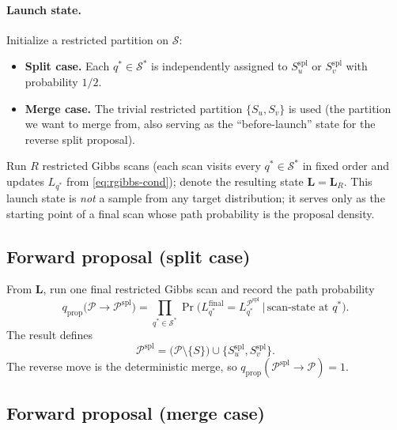 \documentclass[11pt]{article}
\begin{document}
\paragraph{Launch state.}
Initialize a restricted partition on $\mathcal{S}$:
\begin{itemize}
\item \textbf{Split case.} Each $q^*\in\mathcal{S}^*$ is independently
  assigned to $S^{\mathrm{spl}}_u$ or $S^{\mathrm{spl}}_v$ with probability
  $1/2$.
\item \textbf{Merge case.} The trivial restricted partition
  $\{S_u,S_v\}$ is used (the partition we want to merge from, also serving as
  the ``before-launch'' state for the reverse split proposal).
\end{itemize}
Run $R$ restricted Gibbs scans (each scan visits every $q^*\in\mathcal{S}^*$
in fixed order and updates $L_{q^*}$ from \eqref{eq:rgibbs-cond}); denote
the resulting state $\mathbf{L}=\mathbf{L}_R$.  This launch state is
\emph{not} a sample from any target distribution; it serves only as the
starting point of a final scan whose path probability is the proposal
density.

\subsection{Forward proposal (split case)}

From $\mathbf{L}$, run one final restricted Gibbs scan and record the path
probability
\begin{equation}
    q_{\mathrm{prop}}\bigl(\mathcal{P}\to\mathcal{P}^{\mathrm{spl}}\bigr)
    =\prod_{q^*\in\mathcal{S}^*}
        \Pr\bigl(L_{q^*}^{\mathrm{final}}
                =L_{q^*}^{\mathcal{P}^{\mathrm{spl}}}
                \,\big|\,\text{scan-state at $q^*$}\bigr).
    \label{eq:qfwd-split}
\end{equation}
The result defines
\begin{equation}
    \mathcal{P}^{\mathrm{spl}}
    =\bigl(\mathcal{P}\setminus\{S\}\bigr)\cup\{S^{\mathrm{spl}}_u,S^{\mathrm{spl}}_v\}.
\end{equation}
The reverse move is the deterministic merge, so
$q_{\mathrm{prop}}(\mathcal{P}^{\mathrm{spl}}\to\mathcal{P})=1$.

\subsection{Forward proposal (merge case)}
\end{document}
